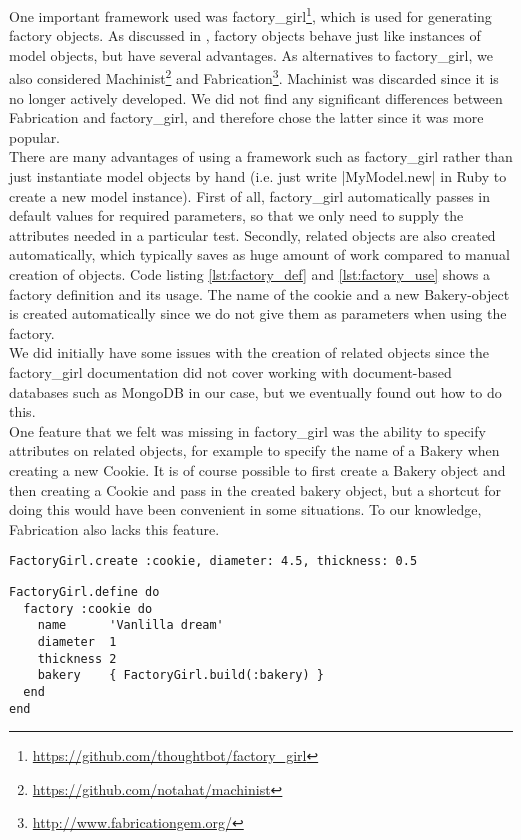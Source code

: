 \MakeShortVerb{\|}

One important framework used was
factory\_girl\footnote{\url{https://github.com/thoughtbot/factory\_girl}},
which is used for generating factory objects. As discussed in
, factory objects behave just like instances of
model objects, but have several advantages. As alternatives to
factory\_girl, we also considered
Machinist\footnote{\url{https://github.com/notahat/machinist}} and
Fabrication\footnote{\url{http://www.fabricationgem.org/}}. Machinist
was discarded since it is no longer actively developed. We did not find
any significant differences between Fabrication and factory\_girl, and
therefore chose the latter since it was more popular.\\

There are many advantages of using a framework such as factory\_girl
rather than just instantiate model objects by hand (i.e. just write
|MyModel.new| in Ruby to create a new model instance). First of all,
factory\_girl automatically passes in default values for required
parameters, so that we only need to supply the attributes needed in a
particular test. Secondly, related objects are also created
automatically, which typically saves as huge amount of work compared to
manual creation of objects. Code listing \ref{lst:factory_def} and
\ref{lst:factory_use} shows a factory definition and its usage. The name
of the cookie and a new Bakery-object is created automatically since we
do not give them as parameters when using the factory.\\

We did initially have some issues with the creation of related objects
since the factory\_girl documentation did not cover working with
document-based databases such as MongoDB in our case, but we eventually
found out how to do this.\\

One feature that we felt was missing in factory\_girl was the ability to
specify attributes on related objects, for example to specify the name
of a Bakery when creating a new Cookie. It is of course possible to
first create a Bakery object and then creating a Cookie and pass in the
created bakery object, but a shortcut for doing this would have been
convenient in some situations. To our knowledge, Fabrication also lacks
this feature.\\

\begin{lstlisting}[caption=Example usage of the factory defined in code listing \ref{lst:factory_def}.,
                   label=lst:factory_use, float=t]
FactoryGirl.create :cookie, diameter: 4.5, thickness: 0.5
\end{lstlisting}

\begin{lstlisting}[caption=A factory definition for a Cookie model.,
                   label=lst:factory_def, float=t]
FactoryGirl.define do
  factory :cookie do
    name      'Vanlilla dream'
    diameter  1
    thickness 2
    bakery    { FactoryGirl.build(:bakery) }
  end
end
\end{lstlisting}


